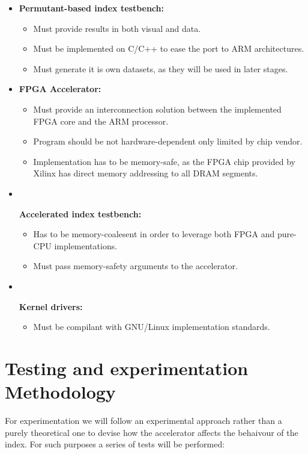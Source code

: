 \begin{itemize}
    \item {\textbf{Permutant-based index testbench:} 
        \begin{itemize}
            \item{Must provide results in both visual and data.}
            \item{Must be implemented on C/C++ to ease the port to ARM architectures.}
            \item{Must generate it is own datasets, as they will be used in later stages.}
        \end{itemize}
    }
    \item {\textbf{FPGA Accelerator:} 
        \begin{itemize}
            \item{Must provide an interconnection solution between the implemented FPGA core and the ARM processor.}
            \item{Program should be not hardware-dependent only limited by chip vendor.}
            \item{Implementation has to be memory-safe, as the FPGA chip provided by Xilinx has direct memory addressing to all DRAM segments.}
        \end{itemize}
    }
    \item {\textbf{Accelerated index testbench:} 
        \begin{itemize}
            \item{Has to be memory-coalesent in order to leverage both FPGA and pure-CPU implementations.}
            \item{Must pass memory-safety arguments to the accelerator.}
        \end{itemize}
    }
    \item {\textbf{Kernel drivers:} 
        \begin{itemize}
            \item{Must be compilant with GNU/Linux implementation standards.}
        \end{itemize}
    }
\end{itemize}


\section{Testing and experimentation Methodology}
For experimentation we will follow an experimental approach rather than a purely theoretical one \cite{citation_required} to devise how the 
accelerator affects the behaivour of the index. For such purposes a series of tests will be performed:

